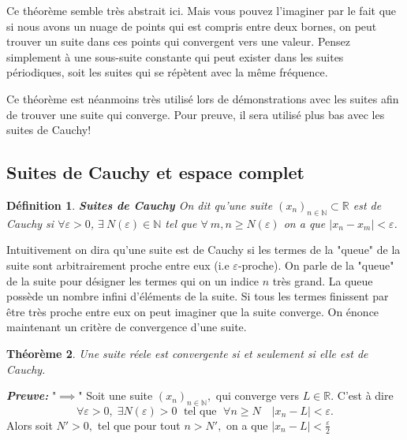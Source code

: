 \documentclass[a4paper, 12pt, french, twoside]{article}
\newtheorem{theorem}{Théorème}[section]
\newtheorem{defi}[theorem]{Définition}
\newcommand{\Nn}{{\mathbb{N}}}
\newcommand{\Rr}{{\mathbb{R}}}
\begin{document}
 

Ce théorème semble très abstrait ici. Mais vous pouvez l'imaginer par le fait que si nous avons un nuage de points qui est compris entre deux bornes, on peut trouver un suite dans ces points qui convergent vers une valeur. Pensez simplement à une sous-suite constante qui peut exister dans les suites périodiques, soit les suites qui se répètent avec la même fréquence.

Ce théorème est néanmoins très utilisé lors de démonstrations avec les suites afin de trouver une suite qui converge. Pour preuve, il sera utilisé plus bas avec les suites de Cauchy!

\subsection{Suites de Cauchy et espace complet}
\begin{defi}{\textbf{Suites de Cauchy}} 
   On dit qu'une suite $(x_n)_{n \in \Nn} \subset \Rr $ est de Cauchy si $\forall \varepsilon >0 $, $\exists \: N(\varepsilon) \in \Nn $ tel que $\forall \: m,n \ge N(\varepsilon)$ on a que $|x_n - x_m| < \varepsilon$.  
\end{defi}
Intuitivement on dira qu'une suite est de Cauchy si les termes de la "queue" de la suite sont arbitrairement proche entre eux (i.e $\varepsilon$-proche).  On parle de la "queue" de la suite pour désigner les termes qui on un indice $n$ très grand. La queue possède un nombre infini d'éléments de la suite.  Si tous les termes finissent par être très proche entre eux on peut imaginer que la suite converge. On énonce maintenant un critère de convergence d'une suite. 


\begin{theorem}\label{thm420}
Une suite réele est convergente si et seulement si elle est de Cauchy.
\end{theorem}

\textit{\textbf{Preuve:}} \newline 
"$\implies$"
     Soit une suite $(x_n)_{n\in \Nn},$ qui converge vers $L\in \Rr.$ C'est à dire 
    \[
    \forall \varepsilon>0, \; \exists N(\varepsilon) >0 \; \text{ tel que } \; \forall n\geq N \quad |x_n-L|<\varepsilon.
    \]
    Alors soit $N'>0,$ tel que pour tout $n > N',$ on a que   $ |x_n - L| < \frac{\varepsilon}{2}$
\end{document}
